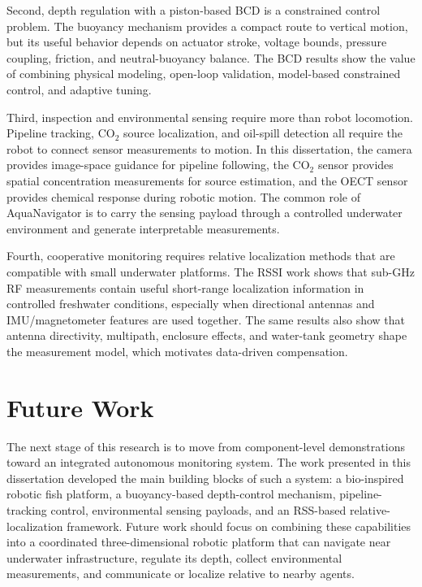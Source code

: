 \documentclass{uhcoethesis}
\begin{document}
Second, depth regulation with a piston-based BCD is a constrained control problem. The buoyancy mechanism provides a compact route to vertical motion, but its useful behavior depends on actuator stroke, voltage bounds, pressure coupling, friction, and neutral-buoyancy balance. The BCD results show the value of combining physical modeling, open-loop validation, model-based constrained control, and adaptive tuning.

Third, inspection and environmental sensing require more than robot locomotion. Pipeline tracking, \mbox{CO$_2$} source localization, and oil-spill detection all require the robot to connect sensor measurements to motion. In this dissertation, the camera provides image-space guidance for pipeline following, the \mbox{CO$_2$} sensor provides spatial concentration measurements for source estimation, and the OECT sensor provides chemical response during robotic motion. The common role of AquaNavigator is to carry the sensing payload through a controlled underwater environment and generate interpretable measurements.

Fourth, cooperative monitoring requires relative localization methods that are compatible with small underwater platforms. The RSSI work shows that sub-GHz RF measurements contain useful short-range localization information in controlled freshwater conditions, especially when directional antennas and IMU/magnetometer features are used together. The same results also show that antenna directivity, multipath, enclosure effects, and water-tank geometry shape the measurement model, which motivates data-driven compensation.

\section{Future Work}

The next stage of this research is to move from component-level demonstrations toward an integrated autonomous monitoring system. The work presented in this dissertation developed the main building blocks of such a system: a bio-inspired robotic fish platform, a buoyancy-based depth-control mechanism, pipeline-tracking control, environmental sensing payloads, and an RSS-based relative-localization framework. Future work should focus on combining these capabilities into a coordinated three-dimensional robotic platform that can navigate near underwater infrastructure, regulate its depth, collect environmental measurements, and communicate or localize relative to nearby agents.
\end{document}
